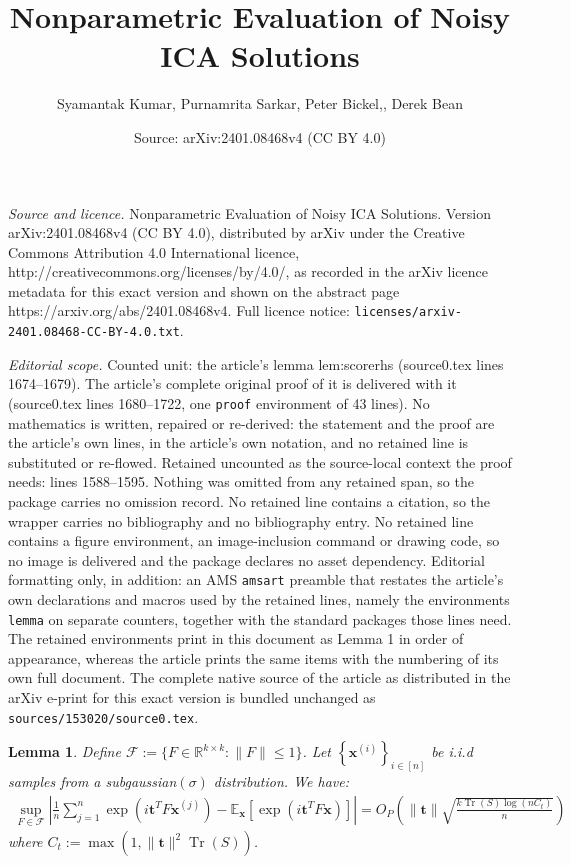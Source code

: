 \documentclass[10pt,a4paper]{amsart}
\title{Nonparametric Evaluation of Noisy ICA Solutions}
\author{Syamantak Kumar, Purnamrita Sarkar, Peter Bickel,, Derek Bean}
\date{Source: arXiv:2401.08468v4 (CC BY 4.0)}
\newtheorem{lemma}{Lemma}
\newcommand{\E}{\mathbb{E}}
\DeclareMathOperator{\Tr}{Tr}
\newcommand{\bas}[1]{\begin{align*}#1\end{align*}}
\newcommand{\bb}[1]{\left(#1\right)}
\newcommand{\bbb}[1]{\left[#1\right]}
\newcommand{\bt}{\pmb{t}}
\newcommand{\bx}{\pmb{x}}
\newcommand{\norm}[1]{\left\|#1\right\|}
\newcommand{\nt}{\|\bt\|}
\newcommand{\nts}{\|\bt\|^2}
\begin{document}
\maketitle

\noindent\emph{Source and licence.} Nonparametric Evaluation of Noisy ICA Solutions. Version arXiv:2401.08468v4 (CC BY 4.0), distributed by arXiv under the Creative Commons Attribution 4.0 International licence, http://creativecommons.org/licenses/by/4.0/, as recorded in the arXiv licence metadata for this exact version and shown on the abstract page https://arxiv.org/abs/2401.08468v4. Full licence notice: \texttt{licenses/arxiv-2401.08468-CC-BY-4.0.txt}.\par\smallskip

\noindent\textit{Editorial scope.} Counted unit: the article's lemma lem:scorerhs (source0.tex lines 1674--1679). The article's complete original proof of it is delivered with it (source0.tex lines 1680--1722, one \texttt{proof} environment of 43 lines). No mathematics is written, repaired or re-derived: the statement and the proof are the article's own lines, in the article's own notation, and no retained line is substituted or re-flowed.  Retained uncounted as the source-local context the proof needs: lines 1588--1595.  Nothing was omitted from any retained span, so the package carries no omission record.  No retained line contains a citation, so the wrapper carries no bibliography and no bibliography entry.  No retained line contains a figure environment, an image-inclusion command or drawing code, so no image is delivered and the package declares no asset dependency.  Editorial formatting only, in addition: an AMS \texttt{amsart} preamble that restates the article's own declarations and macros used by the retained lines, namely the environments \texttt{lemma} on separate counters, together with the standard packages those lines need.  The retained environments print in this document as Lemma 1 in order of appearance, whereas the article prints the same items with the numbering of its own full document.  The complete native source of the article as distributed in the arXiv e-print for this exact version is bundled unchanged as \texttt{sources/153020/source0.tex}.
\begin{lemma}\label{lem:scorelhs}
    Define $\mathcal{F}:=\{F\in \mathbb{R}^{k\times k}:\|F\|\leq 1\}$. Let $\left\{\bx^{(i)}\right\}_{i \in [n]}$ be i.i.d samples from a subgaussian$\bb{\sigma}$ distribution. We have: %
    \bas{
        \sup_{F\in \mathcal{F}}\left|\frac{1}{n}\sum_{j=1}^{n}\exp(i\bt^TF\bx^{\bb{j}})-\E_{\bx}\bbb{\exp(i \bt^T F\bx)}\right| = O_P\bb{\nt\sqrt{\frac{k\Tr(S)\log\bb{nC_{t}}}{n}}}
    }
    where $C_{t} := \max(1,
    \nts\Tr(S))$.
\end{lemma}
\end{document}
